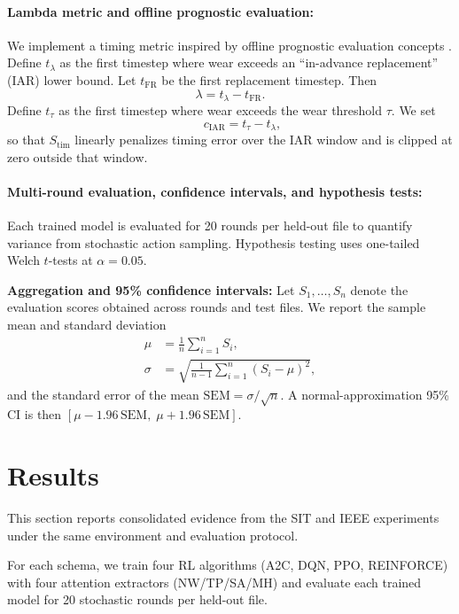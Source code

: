 \documentclass[sn-basic]{sn-jnl} %
\begin{document}
\paragraph{Lambda metric and offline prognostic evaluation:}
We implement a timing metric inspired by offline prognostic evaluation concepts \cite{Saxena2010Metrics}. Define $t_{\lambda}$ as the first timestep where wear exceeds an ``in-advance replacement'' (IAR) lower bound. Let $t_{\mathrm{FR}}$ be the first replacement timestep. Then
\begin{equation}
		\lambda = t_{\lambda} - t_{\mathrm{FR}}.
\end{equation}
Define $t_{\tau}$ as the first timestep where wear exceeds the wear threshold $\tau$. We set
\begin{equation}
\qquad c_{\mathrm{IAR}} = t_{\tau}-t_{\lambda},
\end{equation}
so that $S_{\text{tim}}$ linearly penalizes timing error over the IAR window and is clipped at zero outside that window.

\paragraph{Multi-round evaluation, confidence intervals, and hypothesis tests:}
Each trained model is evaluated for 20 rounds per held-out file to quantify variance from stochastic action sampling. Hypothesis testing uses one-tailed Welch $t$-tests at $\alpha=0.05$.

\textbf{Aggregation and 95\% confidence intervals:}
Let $S_1,\ldots,S_n$ denote the evaluation scores obtained across rounds and test files. We report the sample mean and standard deviation
\begin{align}
\mu &= \frac{1}{n}\sum_{i=1}^{n} S_i,\\
\sigma &= \sqrt{\frac{1}{n-1}\sum_{i=1}^{n}(S_i-\mu)^2},
\end{align}
and the standard error of the mean $\mathrm{SEM}=\sigma/\sqrt{n}$. A normal-approximation 95\% CI is then $[\mu-1.96\,\mathrm{SEM},\;\mu+1.96\,\mathrm{SEM}]$.

\section{Results} \label{sec:results}
This section reports consolidated evidence from the SIT and IEEE experiments under the same environment and evaluation protocol.

For each schema, we train four RL algorithms (\textsc{A2C}, \textsc{DQN}, \textsc{PPO}, \textsc{REINFORCE}) with four attention extractors (NW/TP/SA/MH) and evaluate each trained model for 20 stochastic rounds per held-out file.
\end{document}
